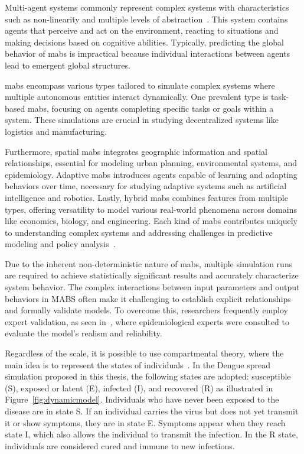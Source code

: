 Multi-agent systems commonly represent complex systems with characteristics such
as non-linearity and multiple levels of abstraction~\citep{furtado:2015}. This
system contains agents that perceive and act on the environment, reacting to
situations and making decisions based on cognitive abilities. Typically,
predicting the global behavior of \gls{mabs} is impractical because individual
interactions between agents lead to emergent global structures.

\gls{mabs} encompass various types tailored to simulate complex systems where
multiple autonomous entities interact dynamically. One prevalent type is
task-based \gls{mabs}, focusing on agents completing specific tasks or goals
within a system. These simulations are crucial in studying decentralized systems
like logistics and manufacturing.

Furthermore, spatial \gls{mabs} integrates geographic information and spatial
relationships, essential for modeling urban planning, environmental systems, and
epidemiology. Adaptive \gls{mabs} introduces agents capable of learning and
adapting behaviors over time, necessary for studying adaptive systems such as
artificial intelligence and robotics. Lastly, hybrid \gls{mabs} combines
features from multiple types, offering versatility to model various real-world
phenomena across domains like economics, biology, and engineering. Each kind of
\gls{mabs} contributes uniquely to understanding complex systems and addressing
challenges in predictive modeling and policy analysis~\citep{Bonabeau:2002}.

Due to the inherent non-deterministic nature of \gls{mabs}, multiple simulation
runs are required to achieve statistically significant results and accurately
characterize system behavior. The complex interactions between input parameters
and output behaviors in MABS often make it challenging to establish explicit
relationships and formally validate models. To overcome this, researchers
frequently employ expert validation, as seen
in~\cite{amouroux:2008,damien:2017}, where epidemiological experts were
consulted to evaluate the model's realism and reliability.

Regardless of the scale, it is possible to use compartmental theory, where the
main idea is to represent the states of individuals~\citep{brauer-2008}. In the
Dengue spread simulation proposed in this thesis, the following states are
adopted: susceptible (S),
exposed or latent (E), infected (I), and recovered (R) as illustrated in
Figure~\ref{fig:dynamicmodel}. Individuals who have never been exposed to the
disease are in state S. If an individual carries the virus but does not yet
transmit it or show symptoms, they are in state E. Symptoms appear when they
reach state I, which also allows the individual to transmit the infection. In
the R state, individuals are considered cured and immune to new infections.


